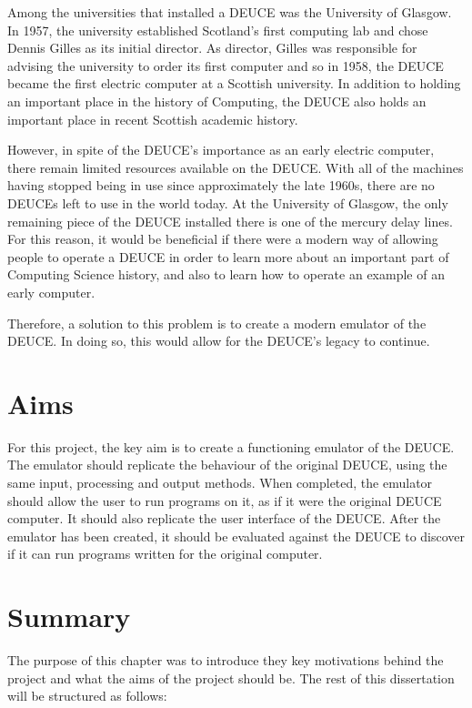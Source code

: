 \documentclass{l4proj}
\begin{document}
Among the universities that installed a DEUCE was the University of Glasgow. In 1957, the university established Scotland's first computing lab and chose Dennis Gilles as its initial director. As director, Gilles was responsible for advising the university to order its first computer and so in 1958, the DEUCE became the first electric computer at a Scottish university. In addition to holding an important place in the history of Computing, the DEUCE also holds an important place in recent Scottish academic history.

However, in spite of the DEUCE's importance as an early electric computer, there remain limited resources available on the DEUCE. With all of the machines having stopped being in use since approximately the late 1960s, there are no DEUCEs left to use in the world today. At the University of Glasgow, the only remaining piece of the DEUCE installed there is one of the mercury delay lines. For this reason, it would be beneficial if there were a modern way of allowing people to operate a DEUCE in order to learn more about an important part of Computing Science history, and also to learn how to operate an example of an early computer.

Therefore, a solution to this problem is to create a modern emulator of the DEUCE. In doing so, this would allow for the DEUCE's legacy to continue.

\section{Aims}

For this project, the key aim is to create a functioning emulator of the DEUCE. The emulator should replicate the behaviour of the original DEUCE, using the same input, processing and output methods. When completed, the emulator should allow the user to run programs on it, as if it were the original DEUCE computer. It should also replicate the user interface of the DEUCE. After the emulator has been created, it should be evaluated against the DEUCE to discover if it can run programs written for the original computer.

\section{Summary}

The purpose of this chapter was to introduce they key motivations behind the project and what the aims of the project should be. The rest of this dissertation will be structured as follows:
\end{document}
